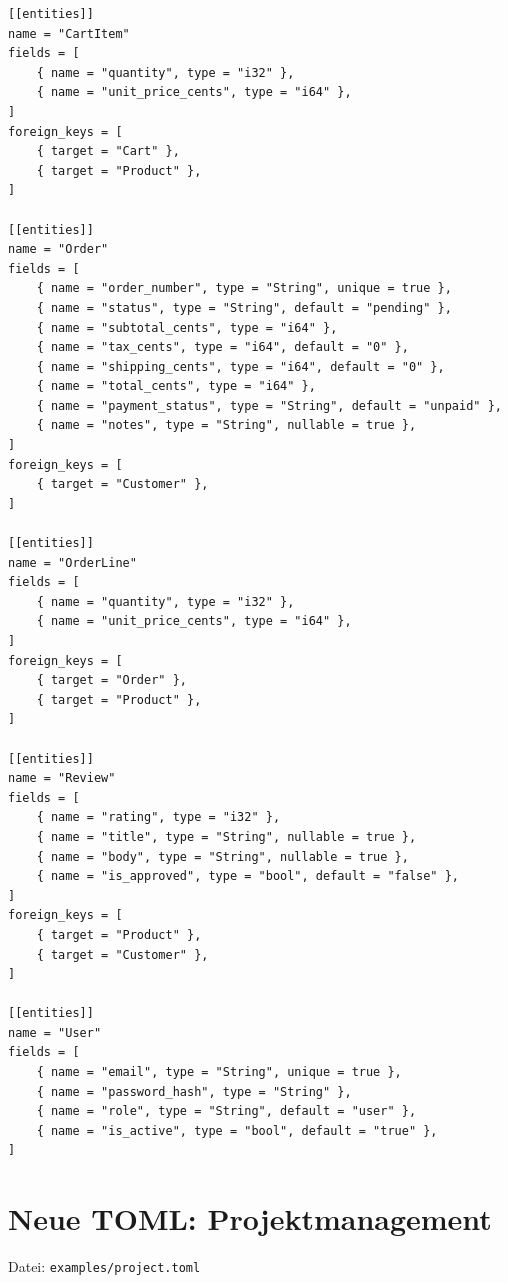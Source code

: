 \documentclass[11pt,a4paper]{article}
\begin{document}
\begin{lstlisting}
[[entities]]
name = "CartItem"
fields = [
    { name = "quantity", type = "i32" },
    { name = "unit_price_cents", type = "i64" },
]
foreign_keys = [
    { target = "Cart" },
    { target = "Product" },
]

[[entities]]
name = "Order"
fields = [
    { name = "order_number", type = "String", unique = true },
    { name = "status", type = "String", default = "pending" },
    { name = "subtotal_cents", type = "i64" },
    { name = "tax_cents", type = "i64", default = "0" },
    { name = "shipping_cents", type = "i64", default = "0" },
    { name = "total_cents", type = "i64" },
    { name = "payment_status", type = "String", default = "unpaid" },
    { name = "notes", type = "String", nullable = true },
]
foreign_keys = [
    { target = "Customer" },
]

[[entities]]
name = "OrderLine"
fields = [
    { name = "quantity", type = "i32" },
    { name = "unit_price_cents", type = "i64" },
]
foreign_keys = [
    { target = "Order" },
    { target = "Product" },
]

[[entities]]
name = "Review"
fields = [
    { name = "rating", type = "i32" },
    { name = "title", type = "String", nullable = true },
    { name = "body", type = "String", nullable = true },
    { name = "is_approved", type = "bool", default = "false" },
]
foreign_keys = [
    { target = "Product" },
    { target = "Customer" },
]

[[entities]]
name = "User"
fields = [
    { name = "email", type = "String", unique = true },
    { name = "password_hash", type = "String" },
    { name = "role", type = "String", default = "user" },
    { name = "is_active", type = "bool", default = "true" },
]
\end{lstlisting}

\section{Neue TOML: Projektmanagement}

Datei: \texttt{examples/project.toml}
\end{document}
